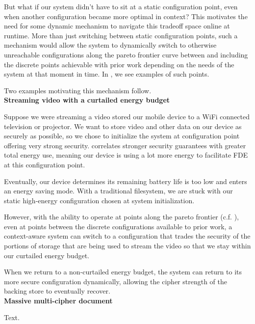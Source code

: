 But what if our system didn't have to sit at a static configuration point, even
when another configuration became more optimal in context? This motivates the
need for some dynamic mechanism to navigate this tradeoff space online at
runtime. More than just switching between static configuration points, such a
mechanism would allow the system to dynamically switch to otherwise unreachable
configurations along the pareto frontier curve between and including the
discrete points achievable with prior work depending on the needs of the system
at that moment in time. In , we see examples of
such points. 

Two examples motivating this mechanism follow.\\

\noindent
\textbf{Streaming video with a curtailed energy budget}

Suppose we were streaming a video stored our mobile device to a WiFi connected
television or projector. We want to store video and other data on our device as
securely as possible, so we chose to initialize the system at configuration
point offering very strong security. 
correlates stronger security guarantees with greater total energy use, meaning
our device is using a lot more energy to facilitate FDE at this configuration
point.

Eventually, our device determines its remaining battery life is too low and
enters an energy saving mode. With a traditional filesystem, we are stuck with
our static high-energy configuration chosen at system initialization.

However, with the ability to operate at points along the pareto frontier (c.f.
), even at points between the discrete
configurations available to prior work, a context-aware system can switch to a
configuration that trades the security of the portions of storage that are being
used to stream the video so that we stay within our curtailed energy budget.

When we return to a non-curtailed energy budget, the system can return to its
more secure configuration dynamically, allowing the cipher strength of the
backing store to eventually recover.\\

\noindent
\textbf{Massive multi-cipher document}

Text.
